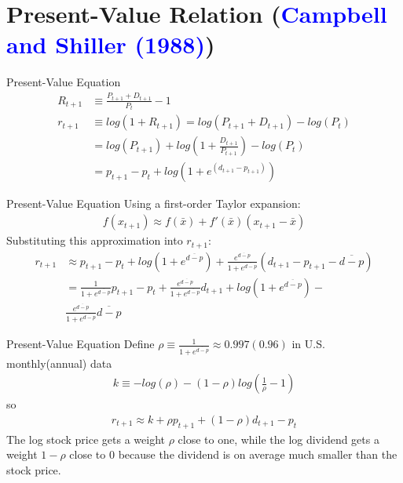 \documentclass{beamer}
\begin{document}
\section{Present-Value Relation (\textcolor{blue}{Campbell and Shiller (1988)})}

\begin{frame}{Present-Value Equation}
	\begin{align*}
		R_{t+1}&\equiv \frac{P_{t+1}+D_{t+1}}{P_{t}}-1\\
		r_{t+1}&\equiv log(1+R_{t+1}) = log\left ( P_{t+1}+D_{t+1} \right )-log\left ( P_{t} \right )\\
		&=log\left ( P_{t+1} \right )+log\left ( 1+\frac{D_{t+1}}{P_{t+1}} \right )-log(P_t)\\
		&=p_{t+1}-p_{t}+log\left ( 1+e^{\left ( d_{t+1}-p_{t+1} \right )} \right )
	\end{align*}
	
\end{frame}

\begin{frame}{Present-Value Equation}
	Using a first-order Taylor expansion:
	\begin{align}
		f\left ( x_{t+1} \right )\approx f\left ( \bar{x} \right )+{f}'\left ( \bar{x} \right )(x_{t+1}-\bar{x})
	\end{align}
	Substituting this approximation into $r_{t+1}$:
	\begin{align}
		r_{t+1}&\approx p_{t+1}-p_{t}+log\left ( 1+e^{\overline{d-p}} \right )+\frac{e^{\overline{d-p}}}{1+e^{\overline{d-p}}}\left ( d_{t+1}-p_{t+1}-\overline{d-p} \right )\\
		&=\frac{1}{1+e^{\overline{d-p}}}p_{t+1}-p_t+\frac{e^{\overline{d-p}}}{1+e^{\overline{d-p}}}d_{t+1}	+log\left ( 1+e^{\overline{d-p}} \right )-\\
		&\frac{e^{\overline{d-p}}}{1+e^{\overline{d-p}}}\overline{d-p}
	\end{align}
\end{frame}

\begin{frame}{Present-Value Equation}
	Define $\rho \equiv \frac{1}{1+e^{\overline{d-p}}} \approx 0.997(0.96)$ in U.S. monthly(annual) data 
	\begin{align*}
		k \equiv-log(\rho)-(1-\rho)log(\frac{1}{\rho}-1)
	\end{align*}
	so 
	\begin{align}
		r_{t+1}\approx k+\rho p_{t+1}+(1-\rho )d_{t+1}-p_t \label{equ:ret}
	\end{align}
	The log stock price gets a weight $ \rho $ close to one, while the log dividend gets
	a weight $ 1-\rho $ close to 0 because the dividend is on average much smaller
	than the stock price.
\end{frame}
\end{document}
